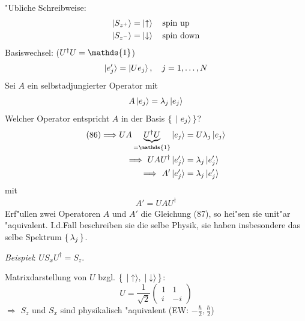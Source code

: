\documentclass[a4paper]{scrartcl}
\newcommand{\dOne}{\ensuremath \mathds{1}}
\begin{document}
{"Ubliche Schreibweise:
\begin{align}
\begin{split}
\ket{S_{z^+}} & = \ket{ \uparrow } \quad \mathrm{spin \ up} \\
\ket{S_{z^-}} & = \ket \downarrow \quad \mathrm{spin \ down}
\end{split}
\end{align}
Basiswechsel: ($U^\dagger U = \dOne$)
\begin{align}
\begin{split}
\ket{ e_j'} = \ket{ U e_j}, \quad j=1, \ldots, N
\end{split}
\end{align}
Sei $A$ ein selbstadjungierter Operator mit
\begin{align}
A \ket{ e_j} = \lambda_j \ket{ e_j }
\end{align}
Welcher Operator entspricht $A$ in der Basis $\set{ \ket{e_j}}$?
\begin{align*}
\mathrm{(86)} \Longrightarrow U A \underbrace{ U^\dagger U}_{= \dOne} \ket{e_j} & = U \lambda_j \ket{ e_j} \\
\Longrightarrow \ UAU^\dagger \ket{e_j'} & = \lambda_j \ket{e_j'} \\
\Longrightarrow \ A' \ket{ e_j'} & = \lambda_j \ket{ e_j'}
\end{align*}
mit
\begin{align}
A' = UAU^\dagger
\end{align}
Erf"ullen zwei Operatoren $A$ und $A'$ die Gleichung (87), so hei"sen sie unit"ar "aquivalent. I.d.Fall beschreiben sie die selbe Physik, sie haben insbesondere das selbe Spektrum $\set{ \lambda_j }$.

\emph{Beispiel}: $U S_x U^\dagger = S_z$.

Matrixdarstellung von $U$ bzgl. $\set{ \ket \uparrow, \ket \downarrow}$:
$$U = \frac1{\sqrt2} \begin{pmatrix} 1 & 1 \\ i & -i \end{pmatrix}$$
$\Longrightarrow$ $S_z$ und $S_x$ sind physikalisch "aquivalent (EW: $-\frac \hbar 2, \frac \hbar 2$)

}
\end{document}
